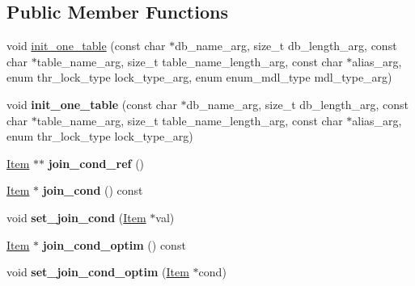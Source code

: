 \subsection*{Public Member Functions}
\begin{DoxyCompactItemize}
\item 
void \mbox{\hyperlink{structTABLE__LIST_a2570739fd11fcfb3bcd5050253b3c7fc}{init\+\_\+one\+\_\+table}} (const char $\ast$db\+\_\+name\+\_\+arg, size\+\_\+t db\+\_\+length\+\_\+arg, const char $\ast$table\+\_\+name\+\_\+arg, size\+\_\+t table\+\_\+name\+\_\+length\+\_\+arg, const char $\ast$alias\+\_\+arg, enum thr\+\_\+lock\+\_\+type lock\+\_\+type\+\_\+arg, enum enum\+\_\+mdl\+\_\+type mdl\+\_\+type\+\_\+arg)
\item 
\mbox{\label{structTABLE__LIST_a240fcf827fe504bebbbb4caa0f76b6ab}} 
void {\bfseries init\+\_\+one\+\_\+table} (const char $\ast$db\+\_\+name\+\_\+arg, size\+\_\+t db\+\_\+length\+\_\+arg, const char $\ast$table\+\_\+name\+\_\+arg, size\+\_\+t table\+\_\+name\+\_\+length\+\_\+arg, const char $\ast$alias\+\_\+arg, enum thr\+\_\+lock\+\_\+type lock\+\_\+type\+\_\+arg)
\item 
\mbox{\label{structTABLE__LIST_a9da2c3ad1d7a0f06112095b5052be192}} 
\mbox{\hyperlink{classItem}{Item}} $\ast$$\ast$ {\bfseries join\+\_\+cond\+\_\+ref} ()
\item 
\mbox{\label{structTABLE__LIST_af0d311128da6065c6d141b434d2dce00}} 
\mbox{\hyperlink{classItem}{Item}} $\ast$ {\bfseries join\+\_\+cond} () const
\item 
\mbox{\label{structTABLE__LIST_afc6f2f983b193f703dfeaff27391fba0}} 
void {\bfseries set\+\_\+join\+\_\+cond} (\mbox{\hyperlink{classItem}{Item}} $\ast$val)
\item 
\mbox{\label{structTABLE__LIST_af2df869aabdf99a0035be35bca4d3bad}} 
\mbox{\hyperlink{classItem}{Item}} $\ast$ {\bfseries join\+\_\+cond\+\_\+optim} () const
\item 
\mbox{\label{structTABLE__LIST_a7cb85184c6fef597d707c5274b82ee1e}} 
void {\bfseries set\+\_\+join\+\_\+cond\+\_\+optim} (\mbox{\hyperlink{classItem}{Item}} $\ast$cond)
\item 
\mbox{\label{structTABLE__LIST_a48e71af0460413687aa84e1db3469068}} 
$$
\end{DoxyCompactItemize}
